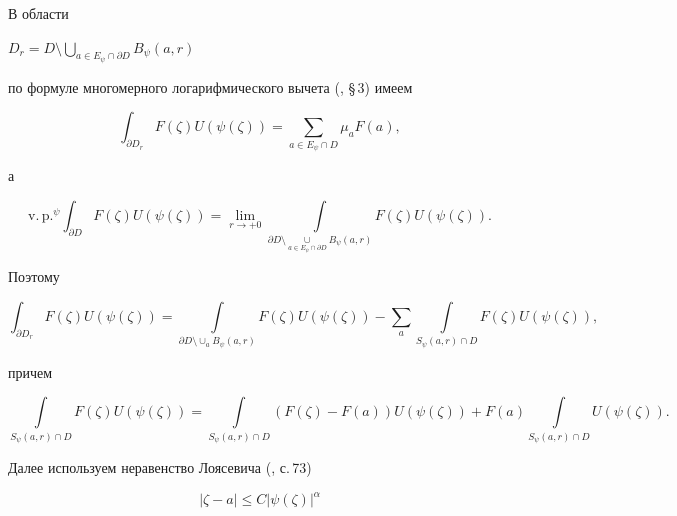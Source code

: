 \begin{pf}


В области


$D_r=D\setminus \bigcup\limits_{a\in E_\psi\cap \partial D}B_\psi(a,r)$


по формуле многомерного логарифмического вычета (\cite{AY}, \S\,3) имеем


$$


\int_{\partial D_r}F(\zeta)U(\psi(\zeta))=\sum_{a\in E_\psi\cap D}\mu_a F(a),


$$


а


$$


\mathrm{v.\,p.}^\psi\int_{\partial D}F(\zeta)U(\psi(\zeta))=


\lim_{r\to+0}\int


\limits_{\partial D\setminus\underset{a\in E_\psi\cap\partial D}{\cup}{}


B_\psi(a,r)}


F(\zeta)U(\psi(\zeta)).


$$


Поэтому


$$


\int_{\partial D_r}


F(\zeta)U(\psi(\zeta))=\int\limits_{\partial D\setminus \cup_a


B_\psi(a,r)}F(\zeta)U(\psi(\zeta)) -\sum_a\int\limits_{S_\psi(a,r)\cap D}


F(\zeta)U(\psi(\zeta)),


$$


причем


\begin{equation}\label{f2}


\int\limits_{S_\psi(a,r)\cap D}F(\zeta)U(\psi(\zeta))=


\int\limits_{S_\psi(a,r)\cap D}(F(\zeta)-F(a))U(\psi(\zeta))+


F(a)\int\limits_{S_\psi(a,r)\cap D}U(\psi(\zeta)).


\end{equation}





Далее используем неравенство Лоясевича (\cite{Ma}, с.\,73)


\begin{equation}\label{f3}


|\zeta-a|\le C|\psi(\zeta)|^\alpha


\end{equation}



\end{pf}
